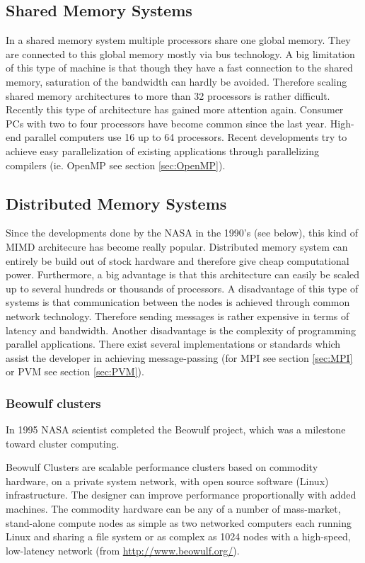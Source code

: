 \subsection{Shared Memory Systems}
\label{sec:sharedmemorysystems}
In a shared memory system multiple processors share one global
memory. They are connected to this global memory mostly via bus
technology. A big limitation of this type of machine is that though they have
a fast connection to the shared memory, saturation of the bandwidth can
hardly be avoided. Therefore scaling shared memory architectures to
more than 32 processors is rather difficult. Recently this type of
architecture has gained more attention again. Consumer PCs with two to four
processors have become common since the last year. High-end parallel
computers use 16 up to 64 processors. Recent developments try to
achieve easy parallelization of existing applications through
parallelizing compilers (ie. OpenMP see section \ref{sec:OpenMP}).

\subsection{Distributed Memory Systems}

Since the developments done by the NASA in the 1990's (see below),
this kind of MIMD architecure has become really popular.
Distributed memory system can
entirely be build out of stock hardware and therefore give cheap
computational power. Furthermore, a big advantage is that this
architecture can easily be scaled up to several hundreds or thousands
of processors. A disadvantage of this type of systems is that
communication between the nodes is achieved through common network
technology. Therefore sending messages is rather expensive in terms of
latency and bandwidth. Another disadvantage is the complexity of
programming parallel applications. There exist several implementations
or standards which assist the developer in achieving message-passing
(for MPI see section \ref{sec:MPI} or PVM see section \ref{sec:PVM}).

\subsubsection{Beowulf clusters}
In 1995 NASA scientist completed the Beowulf project, which was a
milestone toward cluster computing.

Beowulf Clusters are scalable performance clusters based on commodity
hardware, on a private system network, with open source software
(Linux) infrastructure. The designer can improve performance
proportionally with added machines. The commodity hardware can be any
of a number of mass-market, stand-alone compute nodes as simple as two
networked computers each running Linux and sharing a file system or as
complex as 1024 nodes with a high-speed, low-latency network (from
\url{http://www.beowulf.org/}).

